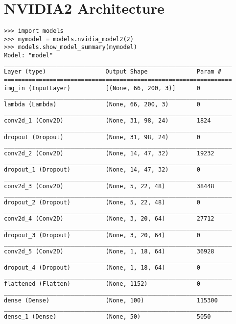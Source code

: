 \section{NVIDIA2 Architecture}
\label{arc:nvidia2}
\begin{verbatim}
>>> import models
>>> mymodel = models.nvidia_model2(2)
>>> models.show_model_summary(mymodel)
Model: "model"
_________________________________________________________________
Layer (type)                 Output Shape              Param #   
=================================================================
img_in (InputLayer)          [(None, 66, 200, 3)]      0         
_________________________________________________________________
lambda (Lambda)              (None, 66, 200, 3)        0         
_________________________________________________________________
conv2d_1 (Conv2D)            (None, 31, 98, 24)        1824      
_________________________________________________________________
dropout (Dropout)            (None, 31, 98, 24)        0         
_________________________________________________________________
conv2d_2 (Conv2D)            (None, 14, 47, 32)        19232     
_________________________________________________________________
dropout_1 (Dropout)          (None, 14, 47, 32)        0         
_________________________________________________________________
conv2d_3 (Conv2D)            (None, 5, 22, 48)         38448     
_________________________________________________________________
dropout_2 (Dropout)          (None, 5, 22, 48)         0         
_________________________________________________________________
conv2d_4 (Conv2D)            (None, 3, 20, 64)         27712     
_________________________________________________________________
dropout_3 (Dropout)          (None, 3, 20, 64)         0         
_________________________________________________________________
conv2d_5 (Conv2D)            (None, 1, 18, 64)         36928     
_________________________________________________________________
dropout_4 (Dropout)          (None, 1, 18, 64)         0         
_________________________________________________________________
flattened (Flatten)          (None, 1152)              0         
_________________________________________________________________
dense (Dense)                (None, 100)               115300    
_________________________________________________________________
dense_1 (Dense)              (None, 50)                5050      

\end{verbatim}
